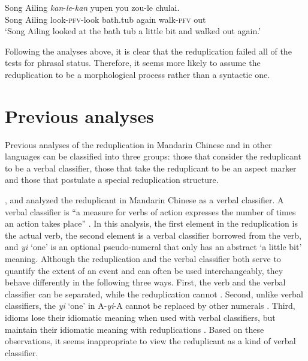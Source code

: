 \documentclass[11pt,a4paper,fleqn,draft]{article}
\let\textbf\emph
\begin{document}
   \ex\label{ex:co-redup2}
   \gll Song Ailing \textbf{kan}-\textbf{le}-\textbf{kan} yupen you zou-le chulai.\\
   Song Ailing look-\textsc{pfv}-look bath.tub again walk-\textsc{pfv} out\\  
   \glt `Song Ailing looked at the bath tub a little bit and walked out again.'
   \z
\z


Following the analyses above, it is clear that the reduplication failed all of the tests for phrasal status. 
Therefore, it seems more likely to assume the reduplication to be a morphological process rather than a syntactic one. 




\section{Previous analyses}\label{ch:prev}

Previous analyses of the reduplication in Mandarin Chinese and in other languages can be classified
into three groups: those that consider the reduplicant to be a verbal classifier, those that take the reduplicant to be an aspect marker
and those that postulate a special reduplication structure.


\citet{Chao1968}, \citet{Fan1964} and \citet{Xiong2016} analyzed the reduplicant in Mandarin Chinese
as a verbal classifier. 
A verbal classifier is ``a measure for verbs of action expresses the number of times an action takes place” \citep[615]{Chao1968}.
In this analysis, the first element in the reduplication is the actual verb, 
the second element is a verbal classifier borrowed from the verb, 
and \emph{yi} `one' is an optional pseudo-numeral that only has an abstract `a little bit' meaning.
Although the reduplication and the verbal classifier both serve to quantify the extent of an event and can often be used interchangeably, 
they behave differently in the following three ways.
First, the verb and the verbal classifier can be separated, while the reduplication cannot \citep[269]{Paris2013}.
Second, unlike verbal classifiers, the \emph{yi} ‘one’ in A-\emph{yi}-A cannot be replaced by other numerals \citep[299--230]{YangWei2017}.
Third, idioms lose their idiomatic meaning when used with verbal classifiers, 
but maintain their idiomatic meaning with reduplications \citep[230--231]{YangWei2017}.
Based on these observations, it seems inappropriate to view the reduplicant as a kind of verbal classifier.
\end{document}
